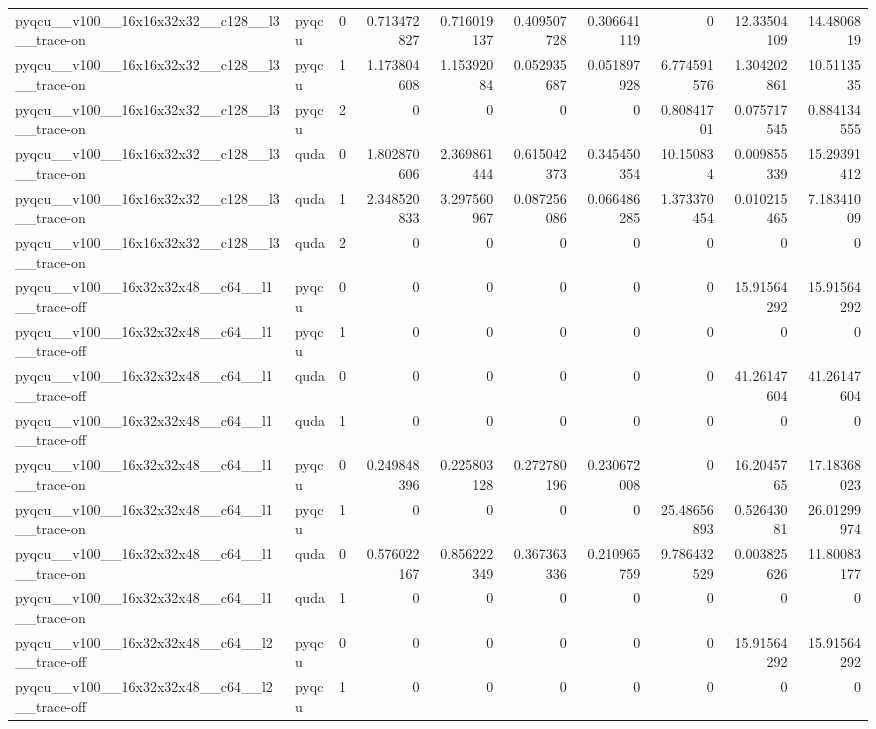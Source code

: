 \begin{table}[htbp]
\begin{tabular}{@{}llrrrrrrrr@{}}
pyqcu\_\_v100\_\_16x16x32x32\_\_c128\_\_l3\_\_trace-on & pyqcu & 0 & 0.713472827 & 0.716019137 & 0.409507728 & 0.306641119 & 0 & 12.33504109 & 14.4806819 \\
pyqcu\_\_v100\_\_16x16x32x32\_\_c128\_\_l3\_\_trace-on & pyqcu & 1 & 1.173804608 & 1.15392084 & 0.052935687 & 0.051897928 & 6.774591576 & 1.304202861 & 10.5113535 \\
pyqcu\_\_v100\_\_16x16x32x32\_\_c128\_\_l3\_\_trace-on & pyqcu & 2 & 0 & 0 & 0 & 0 & 0.80841701 & 0.075717545 & 0.884134555 \\
pyqcu\_\_v100\_\_16x16x32x32\_\_c128\_\_l3\_\_trace-on & quda & 0 & 1.802870606 & 2.369861444 & 0.615042373 & 0.345450354 & 10.150834 & 0.009855339 & 15.29391412 \\
pyqcu\_\_v100\_\_16x16x32x32\_\_c128\_\_l3\_\_trace-on & quda & 1 & 2.348520833 & 3.297560967 & 0.087256086 & 0.066486285 & 1.373370454 & 0.010215465 & 7.18341009 \\
pyqcu\_\_v100\_\_16x16x32x32\_\_c128\_\_l3\_\_trace-on & quda & 2 & 0 & 0 & 0 & 0 & 0 & 0 & 0 \\
pyqcu\_\_v100\_\_16x32x32x48\_\_c64\_\_l1\_\_trace-off & pyqcu & 0 & 0 & 0 & 0 & 0 & 0 & 15.91564292 & 15.91564292 \\
pyqcu\_\_v100\_\_16x32x32x48\_\_c64\_\_l1\_\_trace-off & pyqcu & 1 & 0 & 0 & 0 & 0 & 0 & 0 & 0 \\
pyqcu\_\_v100\_\_16x32x32x48\_\_c64\_\_l1\_\_trace-off & quda & 0 & 0 & 0 & 0 & 0 & 0 & 41.26147604 & 41.26147604 \\
pyqcu\_\_v100\_\_16x32x32x48\_\_c64\_\_l1\_\_trace-off & quda & 1 & 0 & 0 & 0 & 0 & 0 & 0 & 0 \\
pyqcu\_\_v100\_\_16x32x32x48\_\_c64\_\_l1\_\_trace-on & pyqcu & 0 & 0.249848396 & 0.225803128 & 0.272780196 & 0.230672008 & 0 & 16.2045765 & 17.18368023 \\
pyqcu\_\_v100\_\_16x32x32x48\_\_c64\_\_l1\_\_trace-on & pyqcu & 1 & 0 & 0 & 0 & 0 & 25.48656893 & 0.52643081 & 26.01299974 \\
pyqcu\_\_v100\_\_16x32x32x48\_\_c64\_\_l1\_\_trace-on & quda & 0 & 0.576022167 & 0.856222349 & 0.367363336 & 0.210965759 & 9.786432529 & 0.003825626 & 11.80083177 \\
pyqcu\_\_v100\_\_16x32x32x48\_\_c64\_\_l1\_\_trace-on & quda & 1 & 0 & 0 & 0 & 0 & 0 & 0 & 0 \\
pyqcu\_\_v100\_\_16x32x32x48\_\_c64\_\_l2\_\_trace-off & pyqcu & 0 & 0 & 0 & 0 & 0 & 0 & 15.91564292 & 15.91564292 \\
pyqcu\_\_v100\_\_16x32x32x48\_\_c64\_\_l2\_\_trace-off & pyqcu & 1 & 0 & 0 & 0 & 0 & 0 & 0 & 0 \\

\end{tabular}
\end{table}
